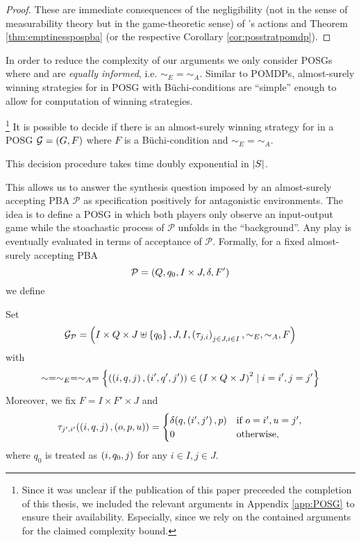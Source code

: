 \begin{proof}
  These are immediate consequences of the negligibility (not in the sense of
  measurability theory but in the game-theoretic sense) of \adam{}'s actions
  and Theorem \ref{thm:emptinesspospba} (or the respective Corollary 
  \ref{cor:posstratpomdp}).
\end{proof}
In order to reduce the complexity of our arguments we only consider \acp{POSG}
where \eve{} and \adam{} are \emph{equally informed}, i.e.
$\sim_{E} = \sim_{A}$. Similar to \acp{POMDP}, almost-surely winning strategies
for \eve{} in \ac{POSG} with Büchi-conditions are \enquote{simple} enough to
allow for computation of winning strategies.
\begin{theorem}
  \cite[Theorem 6]{POSG}\cite[Theorem 5.3]{PureStratPOSG}\footnote{
    Since it was unclear if the publication of this paper preceeded the
    completion of this thesis, we included the relevant arguments in Appendix
    \ref{app:POSG} to ensure their availability. Especially, since we rely on
    the contained arguments for the claimed complexity bound.
  }
  It is possible to decide if there is an almost-surely winning strategy for 
  \eve{} in a \ac{POSG} $\mathcal{G} = \left(G, F\right)$ where $F$ is a 
  Büchi-condition and $\sim_{E} = \sim_{A}$.

  This decision procedure takes time doubly exponential in $\left\vert{S}\right\vert$.
  \label{thm:StratPOSG}
\end{theorem}
This allows us to answer the synthesis question imposed by an almost-surely
accepting \ac{PBA} $\mathcal{P}$ as specification positively for antagonistic
environments. The idea is to define a \ac{POSG} in which both players only
observe an input-output game while the stoachastic process of $\mathcal{P}$
unfolds in the \enquote{background}. Any play is eventually evaluated in terms
of acceptance of $\mathcal{P}$. Formally, for a fixed almost-surely accepting
\ac{PBA}
\begin{equation*}
  \mathcal{P} = \left(Q, q_{0}, I\times J, \delta, F'\right)
\end{equation*}
we define
\begin{definition}
  Set
  \begin{equation*}
    \mathcal{G}_{\mathcal{P}} = \left(I\times Q\times J\uplus\left\{q_{0}\right\}, J,
      I, \left(\tau_{j,i}\right)_{j\in J,i\in I}, \sim_{E}, \sim_{A}, F\right)
  \end{equation*}
  with
  \begin{equation*}
    \sim = \sim_{E} = \sim_{A} = \left\{\left(\left(i, q, j\right), 
    \left(i', q', j'\right)\right)\in \left(I\times Q\times J\right)^{2}\mid i = i', j = j'\right\}
  \end{equation*}
  Moreover, we fix $F = I\times F'\times J$ and
  \begin{equation*}
    \tau_{j',i'}(\left(i, q, j\right), \left(o, p, u\right)) = \begin{cases}
      \delta(q, \left(i', j'\right), p)&\text{if }o = i', u = j',\\
      0&\text{otherwise},
    \end{cases}
  \end{equation*}
  where $q_{0}$ is treated as $\left(i, q_{0}, j\right)$ for any $i\in I, j\in J$.
\end{definition}
